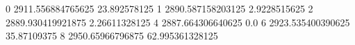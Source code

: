 0 2911.556884765625 23.892578125
1 2890.587158203125 2.9228515625
2 2889.930419921875 2.26611328125
4 2887.664306640625 0.0
6 2923.535400390625 35.87109375
8 2950.65966796875 62.995361328125
